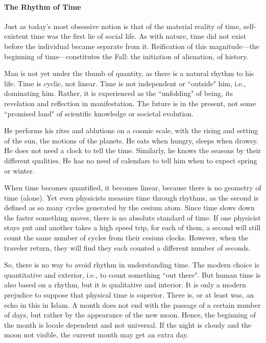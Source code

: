 \paragraph{The Rhythm of Time}
\begin{quotex}
Just as today's most obsessive notion is that of the material reality of time, self-existent time was the first lie of social life. As with nature, time did not exist before the individual became separate from it. Reification of this magnitude—the beginning of time—constitutes the Fall: the initiation of alienation, of history. 

\end{quotex}
Man is not yet under the thumb of quantity, as there is a natural rhythm to his life. Time is cyclic, not linear. Time is not independent or ``outside" him, i.e., dominating him. Rather, it is experienced as the ``unfolding" of being, its revelation and reflection in manifestation. The future is in the present, not some ``promised land" of scientific knowledge or societal evolution.

He performs his rites and ablutions on a cosmic scale, with the rising and setting of the sun, the motions of the planets. He eats when hungry, sleeps when drowsy. He does not need a clock to tell the time. Similarly, he knows the seasons by their different qualities. He has no need of calendars to tell him when to expect spring or winter.

When time becomes quantified, it becomes linear, because there is no geometry of time (alone). Yet even physicists measure time through rhythms, as the second is defined as so many cycles generated by the cesium atom. Since time slows down the faster something moves, there is no absolute standard of time. If one physicist stays put and another takes a high speed trip, for each of them, a second will still count the same number of cycles from their cesium clocks. However, when the traveler return, they will find they each counted a different number of seconds.

So, there is no way to avoid rhythm in understanding time. The modern choice is quantitative and exterior, i.e., to count something ``out there". But human time is also based on a rhythm, but it is qualitative and interior. It is only a modern prejudice to suppose that physical time is superior. There is, or at least was, an echo in this in Islam. A month does not end with the passage of a certain number of days, but rather by the appearance of the new moon. Hence, the beginning of the month is locale dependent and not universal. If the night is cloudy and the moon not visible, the current month may get an extra day.

